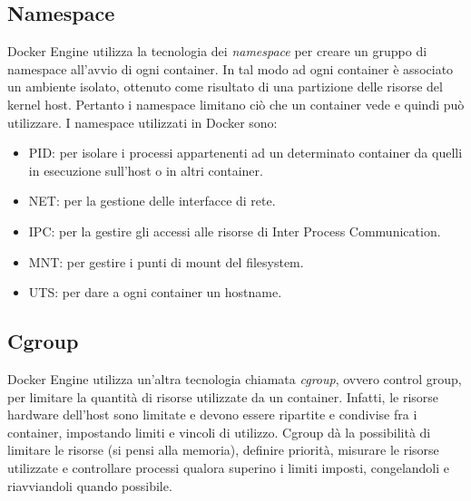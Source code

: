 \subsection{Namespace}
Docker Engine utilizza la tecnologia dei \emph{namespace} per creare un gruppo di namespace all'avvio di ogni container. In tal modo ad ogni container è associato un ambiente isolato, ottenuto come risultato di una partizione delle risorse del kernel host. Pertanto i namespace limitano ciò che un container vede e quindi può utilizzare. I namespace utilizzati in Docker sono:
\begin{itemize}
    \item PID: per isolare i processi appartenenti ad un determinato container da quelli in esecuzione sull'host o in altri container.
    \item NET: per la gestione delle interfacce di rete.
    \item IPC: per la gestire gli accessi alle risorse di Inter Process Communication.
    \item MNT: per gestire i punti di mount del filesystem.
    \item UTS: per dare a ogni container un hostname.
\end{itemize}

\subsection{Cgroup}
Docker Engine utilizza un'altra tecnologia chiamata \emph{cgroup}, ovvero control group, per limitare la quantità di risorse utilizzate da un container. Infatti, le risorse hardware dell'host sono limitate e devono essere ripartite e condivise fra i container, impostando limiti e vincoli di utilizzo. Cgroup dà la possibilità di limitare le risorse (si pensi alla memoria), definire priorità, misurare le risorse utilizzate e controllare processi qualora superino i limiti imposti, congelandoli e riavviandoli quando possibile.

